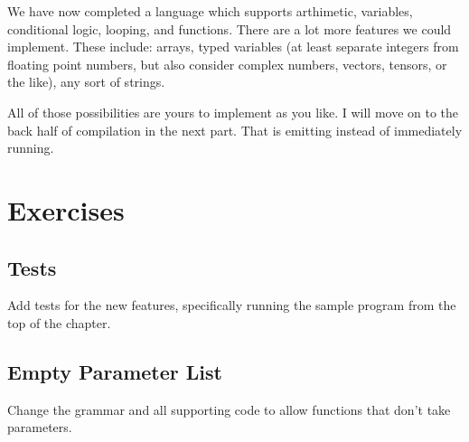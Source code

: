 We have now completed a language which supports arthimetic, variables,
conditional logic, looping, and functions. There are a lot more features
we could implement. These include: arrays, typed variables (at least
separate integers from floating point numbers, but also consider complex
numbers, vectors, tensors, or the like), any sort of strings.

All of those possibilities are yours to implement as you like.
I will move on to the back half of compilation in the next part.
That is emitting instead of immediately running.

\section{Exercises}

\subsection{Tests}

Add tests for the new features, specifically running the sample program
from the top of the chapter.

\subsection{Empty Parameter List}

Change the grammar and all supporting code to allow functions that
don't take parameters.
